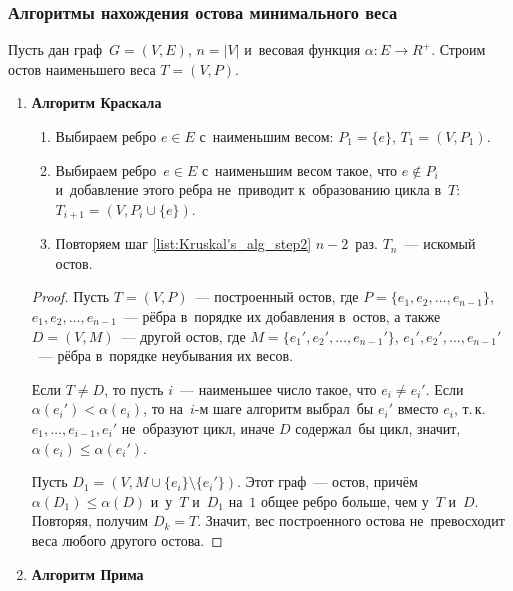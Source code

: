 \subsubsection{Алгоритмы нахождения остова минимального веса}
Пусть дан граф~$G = (V, E)$, $n = |V|$ и~весовая функция $\alpha \colon E \to R^+$.
Строим остов наименьшего веса $T = (V, P)$.
\begin{enumerate}
	\item\textbf{Алгоритм Краскала}
	\begin{enumerate}
		\item Выбираем ребро $e \in E$ с~наименьшим весом: $P_1 = \{ e \}$, $T_1 = (V, P_1)$.
		\item\label{list:Kruskal's_alg_step2} Выбираем ребро~$e \in E$ с~наименьшим весом такое, что $e \notin P_i$ и~добавление этого ребра не~приводит к~образованию цикла в~$T$: $T_{i+1} = (V, P_i \cup \{ e \})$.
		\item Повторяем шаг \ref{list:Kruskal's_alg_step2} $n - 2$~раз.
		$T_n$~--- искомый остов.
	\end{enumerate}
	\begin{proof}
		Пусть $T = (V, P)$~--- построенный остов, где $P = \{ e_1, e_2, \ldots, e_{n-1} \}$, $e_1, e_2, \ldots, \allowbreak e_{n-1}$~--- рёбра в~порядке их добавления в~остов, а также $D = (V, M)$~--- другой остов, где $M = \{ e_1', e_2', \ldots, \allowbreak e_{n-1}' \}$, $e_1', e_2', \ldots, \allowbreak e_{n-1}'$~--- рёбра в~порядке неубывания их весов.
		
		Если $T \neq D$, то пусть $i$~--- наименьшее число такое, что $e_i \neq e_i'$.
		Если $\alpha(e_i') < \alpha(e_i)$, то на~$i$\nobreakdash-м шаге алгоритм выбрал~бы $e_i'$ вместо $e_i$, т.\,к. $e_1, \ldots, e_{i-1}, e_i'$ не~образуют цикл, иначе $D$ содержал~бы цикл, значит, $\alpha(e_i) \leqslant \alpha(e_i')$.
		
		Пусть $D_1 = (V, M \cup \{ e_i \} \setminus \{ e_i' \})$.
		Этот граф~--- остов, причём $\alpha(D_1) \leqslant \alpha(D)$ и~у~$T$ и~$D_1$ на~$1$ общее ребро больше, чем у~$T$ и~$D$.
		Повторяя, получим $D_k = T$.
		Значит, вес построенного остова не~превосходит веса любого другого остова.
	\end{proof}

	\item\textbf{Алгоритм Прима}
	

\end{enumerate}
